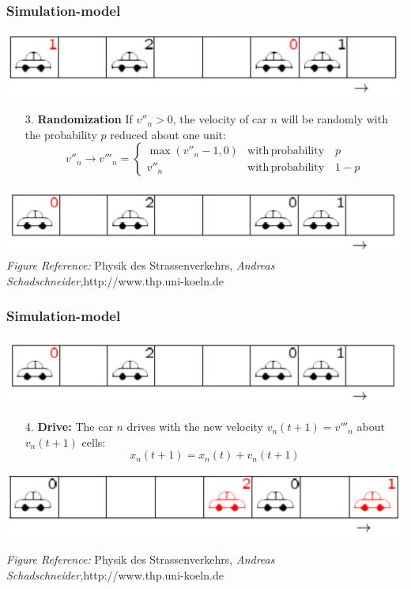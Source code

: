 \documentclass[9pt]{beamer}
\begin{document}
\begin{frame}
\frametitle{Simulation-model}

\includegraphics[width=0.7\columnwidth]{config_3.png}
\begin{itemize}
\item[3.]  \textbf{Randomization}
If $v''_n>0$, the velocity of car $n$ will be randomly with the probability $p$ reduced about one unit:
\begin{equation}
v''_n \rightarrow v'''_n=
\begin{cases}
\max(v''_n-1,0) & \mathrm{with\,probability} \quad p\\
v''_n & \mathrm{with\,probability} \quad 1-p
\end{cases}
\label{hangb}
\end{equation}
\end{itemize}
\includegraphics[width=0.7\columnwidth]{config_4.png}\\
\textit{Figure Reference:} Physik des Strassenverkehrs, \emph{Andreas Schadschneider,}http://www.thp.uni-koeln.de
\end{frame}
\begin{frame}
\frametitle{Simulation-model}

\includegraphics[width=0.7\columnwidth]{config_4.png}
\begin{itemize}
\item[4.] \textbf{Drive:}
The car $n$ drives with the new velocity $v_n(t+1)=v'''_n$ about $v_n(t+1)$ cells:
\begin{equation}
x_n(t+1)=x_n(t)+v_n(t+1)
\label{drive}
\end{equation}
\end{itemize}
\includegraphics[width=0.7\columnwidth]{config_5.png}

\textit{Figure Reference:} Physik des Strassenverkehrs, \emph{Andreas Schadschneider,}http://www.thp.uni-koeln.de
\label{example_ns} 

\end{frame}
\end{document}
